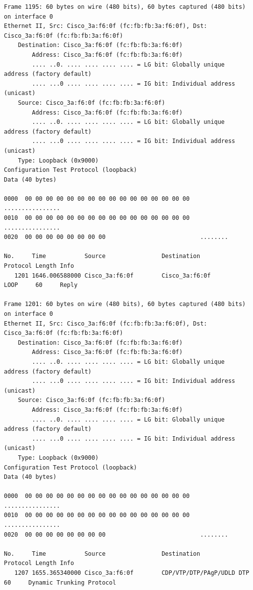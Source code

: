 \documentclass[a4paper,11pt]{article}
\begin{document}
\begin{lstlisting}
Frame 1195: 60 bytes on wire (480 bits), 60 bytes captured (480 bits) on interface 0
Ethernet II, Src: Cisco_3a:f6:0f (fc:fb:fb:3a:f6:0f), Dst: Cisco_3a:f6:0f (fc:fb:fb:3a:f6:0f)
    Destination: Cisco_3a:f6:0f (fc:fb:fb:3a:f6:0f)
        Address: Cisco_3a:f6:0f (fc:fb:fb:3a:f6:0f)
        .... ..0. .... .... .... .... = LG bit: Globally unique address (factory default)
        .... ...0 .... .... .... .... = IG bit: Individual address (unicast)
    Source: Cisco_3a:f6:0f (fc:fb:fb:3a:f6:0f)
        Address: Cisco_3a:f6:0f (fc:fb:fb:3a:f6:0f)
        .... ..0. .... .... .... .... = LG bit: Globally unique address (factory default)
        .... ...0 .... .... .... .... = IG bit: Individual address (unicast)
    Type: Loopback (0x9000)
Configuration Test Protocol (loopback)
Data (40 bytes)

0000  00 00 00 00 00 00 00 00 00 00 00 00 00 00 00 00   ................
0010  00 00 00 00 00 00 00 00 00 00 00 00 00 00 00 00   ................
0020  00 00 00 00 00 00 00 00                           ........

No.     Time           Source                Destination           Protocol Length Info
   1201 1646.006588000 Cisco_3a:f6:0f        Cisco_3a:f6:0f        LOOP     60     Reply

Frame 1201: 60 bytes on wire (480 bits), 60 bytes captured (480 bits) on interface 0
Ethernet II, Src: Cisco_3a:f6:0f (fc:fb:fb:3a:f6:0f), Dst: Cisco_3a:f6:0f (fc:fb:fb:3a:f6:0f)
    Destination: Cisco_3a:f6:0f (fc:fb:fb:3a:f6:0f)
        Address: Cisco_3a:f6:0f (fc:fb:fb:3a:f6:0f)
        .... ..0. .... .... .... .... = LG bit: Globally unique address (factory default)
        .... ...0 .... .... .... .... = IG bit: Individual address (unicast)
    Source: Cisco_3a:f6:0f (fc:fb:fb:3a:f6:0f)
        Address: Cisco_3a:f6:0f (fc:fb:fb:3a:f6:0f)
        .... ..0. .... .... .... .... = LG bit: Globally unique address (factory default)
        .... ...0 .... .... .... .... = IG bit: Individual address (unicast)
    Type: Loopback (0x9000)
Configuration Test Protocol (loopback)
Data (40 bytes)

0000  00 00 00 00 00 00 00 00 00 00 00 00 00 00 00 00   ................
0010  00 00 00 00 00 00 00 00 00 00 00 00 00 00 00 00   ................
0020  00 00 00 00 00 00 00 00                           ........

No.     Time           Source                Destination           Protocol Length Info
   1207 1655.365340000 Cisco_3a:f6:0f        CDP/VTP/DTP/PAgP/UDLD DTP      60     Dynamic Trunking Protocol


\end{lstlisting}
\end{document}
